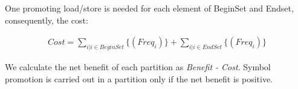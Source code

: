 One promoting load/store is needed for each element of BeginSet and Endset, consequently, the cost:

{\begin{scriptsize}
\begin{equation} 
\begin{split}
Cost= \sum_{i | i \in BeginSet}\{ (Freq_{i})\} + \sum_{i | i \in EndSet}\{ (Freq_{i})\} 
\end{split}
\end{equation} 
\end{scriptsize}}
We calculate the net benefit of each partition as \emph{Benefit - Cost}. Symbol promotion is carried out in a partition only if the net benefit is positive. 

